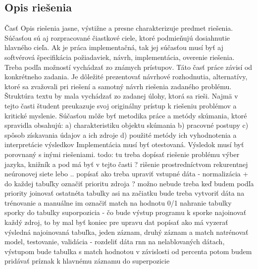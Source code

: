 \subsection{Opis riešenia}
Časť Opis riešenia jasne, výstižne a presne charakterizuje predmet riešenia. Súčasťou sú aj rozpracované čiastkové ciele, ktoré podmieňujú dosiahnutie hlavného cieľa. Ak je práca implementačná, tak jej súčasťou musí byť aj softvérová špecifikácia požiadaviek, návrh, implementácia, overenie riešenia. Treba podľa možností vychádzať zo známych prístupov. Táto časť práce závisí od konkrétneho zadania. Je dôležité prezentovať návrhové rozhodnutia, alternatívy, ktoré sa zvažovali pri riešení a samotný návrh riešenia zadaného problému. Štruktúra textu by mala vychádzať zo zadanej úlohy, ktorá sa rieši. Najmä v tejto časti študent preukazuje svoj originálny prístup k riešeniu problémov a kritické myslenie.
\newline
Súčasťou môže byť metodika práce a metódy skúmania, ktoré spravidla obsahujú: 
a) charakteristiku objektu skúmania 
b) pracovné postupy 
c) spôsob získavania údajov a ich zdroje 
d) použité metódy ich vyhodnotenia a interpretácie výsledkov 
Implementácia musí byť otestovaná. Výsledok musí byť porovnaný s inými riešeniami.
\newline \newline
todo: tu treba dopísať riešenie problému 
\newline
výber jazyka, knižník a pod má byť v tejto časti ? 
\newline
rišenie prostredníctvom rekurentnej neúronovej siete lebo ..
\newline
popísať ako treba upraviť vstupné dáta - normalizácia 
\newline
+ do každej tabuľky označiť prioritu zdroja ? možno nebude treba keď budem podľa priority joinovať 
ostatnéta tabulky
\newline
asi na začiatku bude treba vytvoriť dáta na trénovanie a manuálne im označiť match na  hodnotu 0/1
\newline
nahranie tabulky sporky do tabulky suporpozicia - čo bude výstup programu 
\newline
k sporke najoinovať každý zdroj, to by mal byť koniec pre upravu dat
\newline
popísať ako má vyzerať výsledná najoinovaná tabuľka, jeden záznam, druhý záznam a match
\newline
natrénovať model, testovanie, validácia - rozdeliť dáta 
\newline
rnn na nelablovaných dátach, výstupom bude tabulka s match hodnotou 
\newline
v závislosti od percenta potom budem pridávať príznak k hlavnému záznamu do superpozicie


